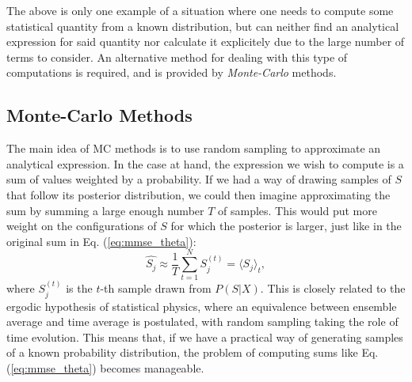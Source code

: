\documentclass{article}
\begin{document}
The above is only one example of a situation where one needs to compute some statistical quantity from a known distribution, but can neither find an analytical expression for said quantity nor calculate it explicitely due to the large number of terms to consider. An alternative method for dealing with this type of computations is required, and is provided by \emph{Monte-Carlo} methods.

\subsection{Monte-Carlo Methods}
The main idea of MC methods is to use random sampling to approximate an analytical expression. In the case at hand, the expression we wish to compute is a sum of values weighted by a probability. If we had a way of drawing samples of $S$ that follow its posterior distribution, we could then imagine approximating the sum by summing a large enough number $T$ of samples. This would put more weight on the configurations of $S$ for which the posterior is larger, just like in the original sum in Eq. (\ref{eq:mmse_theta}):
\begin{equation}
    \hat{S_j}
    \approx
    \frac{1}{T}
    \sum_{t=1}^{N} S_j^{(t)}
    =
    \langle S_j \rangle_t,
\end{equation}
where $S_j^{(t)}$ is the $t$-th sample drawn from $P(S | X)$. This is closely related to the ergodic hypothesis of statistical physics, where an equivalence between ensemble average and time average is postulated, with random sampling taking the role of time evolution. This means that, if we have a practical way of generating samples of a known probability distribution, the problem of computing sums like Eq. (\ref{eq:mmse_theta}) becomes manageable. 
\end{document}
